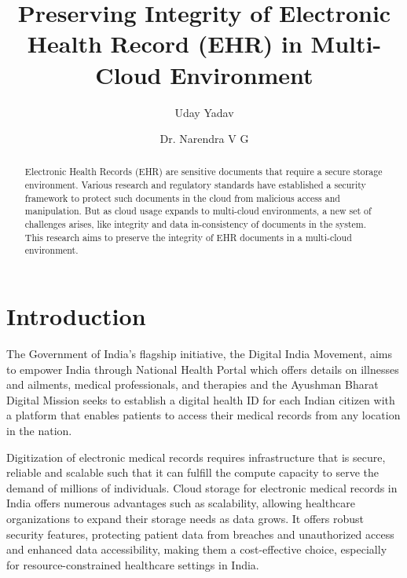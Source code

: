 \documentclass[runningheads]{llncs}
\begin{document}
\title{Preserving Integrity of Electronic Health Record (EHR) in Multi-Cloud Environment}

\author{Uday Yadav \and
Dr. Narendra V G}

\authorrunning{}


%
\maketitle             
%

\vspace{-0.5cm}

\begin{abstract}
Electronic Health Records (EHR) are sensitive documents that require a secure storage environment. Various research and regulatory standards have established a security framework to protect such documents in the cloud from malicious access and manipulation. But as cloud usage expands to multi-cloud environments, a new set of challenges arises, like integrity and data in-consistency of documents in the system. This research aims to preserve the integrity of EHR documents in a multi-cloud environment. 

\end{abstract}

\vspace{-0.5cm}

\section{Introduction}

The Government of India's flagship initiative, the Digital India Movement, aims to empower India through National Health Portal which offers details on illnesses and ailments, medical professionals, and therapies and the Ayushman Bharat Digital Mission seeks to establish a digital health ID for each Indian citizen with a platform that enables patients to access their medical records from any location in the nation. 

Digitization of electronic medical records requires infrastructure that is secure, reliable and scalable such that it can fulfill the compute capacity to serve the demand of millions of individuals. Cloud storage for electronic medical records in India offers numerous advantages such as scalability, allowing healthcare organizations to expand their storage needs as data grows. It offers robust security features, protecting patient data from breaches and unauthorized access and enhanced data accessibility, making them a cost-effective choice, especially for resource-constrained healthcare settings in India. 
\end{document}
